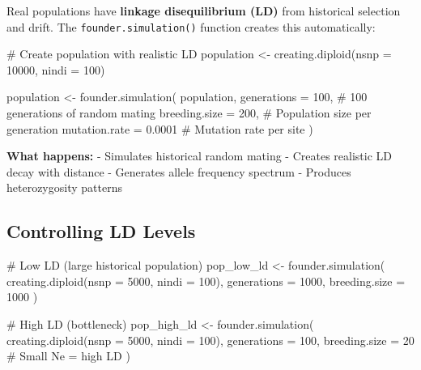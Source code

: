 \documentclass[
  letterpaper,
]{book}
\newenvironment{Shaded}{\begin{snugshade}}{\end{snugshade}}
\newcommand{\AttributeTok}[1]{\textcolor[rgb]{0.40,0.45,0.13}{#1}}
\newcommand{\CommentTok}[1]{\textcolor[rgb]{0.37,0.37,0.37}{#1}}
\newcommand{\DecValTok}[1]{\textcolor[rgb]{0.68,0.00,0.00}{#1}}
\newcommand{\FloatTok}[1]{\textcolor[rgb]{0.68,0.00,0.00}{#1}}
\newcommand{\FunctionTok}[1]{\textcolor[rgb]{0.28,0.35,0.67}{#1}}
\newcommand{\NormalTok}[1]{\textcolor[rgb]{0.00,0.23,0.31}{#1}}
\newcommand{\OtherTok}[1]{\textcolor[rgb]{0.00,0.23,0.31}{#1}}
\begin{document}
Real populations have \textbf{linkage disequilibrium (LD)} from
historical selection and drift. The \texttt{founder.simulation()}
function creates this automatically:

\begin{Shaded}
\begin{Highlighting}[]
\CommentTok{\# Create population with realistic LD}
\NormalTok{population }\OtherTok{\textless{}{-}} \FunctionTok{creating.diploid}\NormalTok{(}\AttributeTok{nsnp =} \DecValTok{10000}\NormalTok{, }\AttributeTok{nindi =} \DecValTok{100}\NormalTok{)}

\NormalTok{population }\OtherTok{\textless{}{-}} \FunctionTok{founder.simulation}\NormalTok{(}
\NormalTok{  population,}
  \AttributeTok{generations =} \DecValTok{100}\NormalTok{,        }\CommentTok{\# 100 generations of random mating}
  \AttributeTok{breeding.size =} \DecValTok{200}\NormalTok{,      }\CommentTok{\# Population size per generation}
  \AttributeTok{mutation.rate =} \FloatTok{0.0001}    \CommentTok{\# Mutation rate per site}
\NormalTok{)}
\end{Highlighting}
\end{Shaded}

\textbf{What happens:} - Simulates historical random mating - Creates
realistic LD decay with distance - Generates allele frequency spectrum -
Produces heterozygosity patterns

\subsection{Controlling LD Levels}\label{controlling-ld-levels}

\begin{Shaded}
\begin{Highlighting}[]
\CommentTok{\# Low LD (large historical population)}
\NormalTok{pop\_low\_ld }\OtherTok{\textless{}{-}} \FunctionTok{founder.simulation}\NormalTok{(}
  \FunctionTok{creating.diploid}\NormalTok{(}\AttributeTok{nsnp =} \DecValTok{5000}\NormalTok{, }\AttributeTok{nindi =} \DecValTok{100}\NormalTok{),}
  \AttributeTok{generations =} \DecValTok{1000}\NormalTok{,}
  \AttributeTok{breeding.size =} \DecValTok{1000}
\NormalTok{)}

\CommentTok{\# High LD (bottleneck)}
\NormalTok{pop\_high\_ld }\OtherTok{\textless{}{-}} \FunctionTok{founder.simulation}\NormalTok{(}
  \FunctionTok{creating.diploid}\NormalTok{(}\AttributeTok{nsnp =} \DecValTok{5000}\NormalTok{, }\AttributeTok{nindi =} \DecValTok{100}\NormalTok{),}
  \AttributeTok{generations =} \DecValTok{100}\NormalTok{,}
  \AttributeTok{breeding.size =} \DecValTok{20}        \CommentTok{\# Small Ne = high LD}
\NormalTok{)}
\end{Highlighting}
\end{Shaded}
\end{document}
